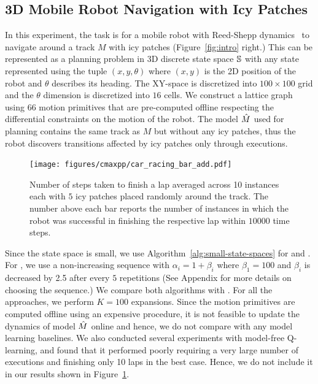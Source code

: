 \subsection{3D Mobile Robot Navigation with Icy Patches}
\label{sec:simulated-3d-mobile}

In this experiment, the task is for a mobile robot with Reed-Shepp
dynamics~\cite{reeds1990} to navigate around a track $M$ with icy
patches (Figure~\ref{fig:intro} right.) This
can be represented as a planning problem in 3D discrete state space
$\mathbb{S}$ with any state represented using the tuple $(x, y,
\theta)$ where $(x, y)$ is the 2D position of the robot and $\theta$
describes its heading. The XY-space is discretized into $100 \times
100$ grid and the $\theta$ dimension is discretized into $16$
cells. We construct a lattice
graph~\cite{DBLP:journals/jfr/PivtoraikoKK09} using $66$ motion
primitives that are pre-computed offline respecting the differential
constraints on the motion of the robot. The model $\hat{M}$ used for
planning contains the same track as $M$ but without any icy patches,
thus the robot discovers transitions affected by icy patches only
through executions.

\begin{figure}[t]
  \centering
  \texttt{[image: figures/cmaxpp/car\_racing\_bar\_add.pdf]}
  \caption{Number of steps taken to finish a lap averaged across 10 instances each with $5$ icy patches placed randomly around the track. The number above each bar reports the number of instances in which the robot was successful in finishing the respective lap within $10000$ time steps.}
  \label{fig:car_racing}
\end{figure}

Since the state space is small, we use
Algorithm~\ref{alg:small-state-spaces} for \cmaxpp{} and
\acmaxpp{}. For \acmaxpp{}, we use a non-increasing sequence with
$\alpha_i = 1 + \beta_i$ where $\beta_1 = 100$ and $\beta_i$ is
decreased by 2.5 after every $5$ repetitions (See Appendix for more details on choosing the sequence.) We
compare both algorithms with \cmax{}. For all the approaches, we
perform $K=100$ expansions. Since
the motion primitives are computed offline using an expensive
procedure, it is not feasible to update the dynamics of model $\hat{M}$
online and hence, we do not compare with any model learning baselines. We
also conducted several experiments with model-free Q-learning, and found that it
performed poorly requiring a very large number of executions and finishing
only 10 laps in the best case. Hence, we do not include it in our
results shown in Figure~\ref{fig:car_racing}.

